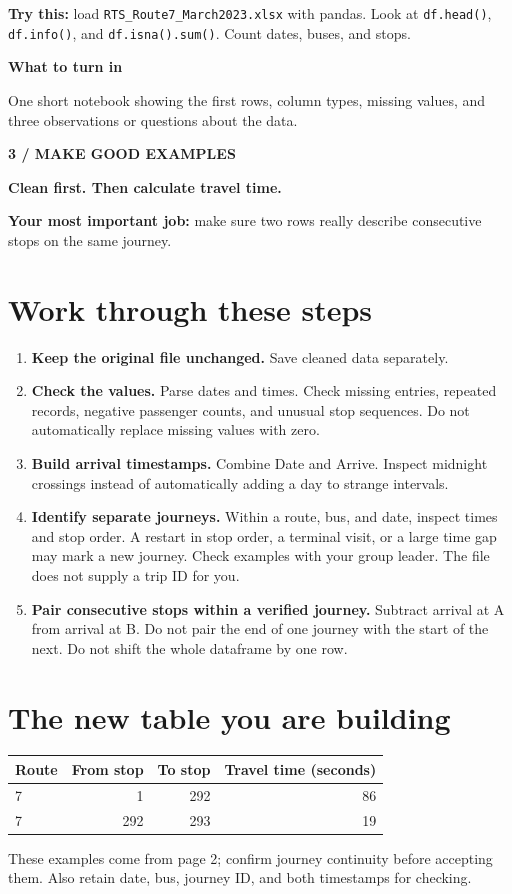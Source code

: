 \documentclass[11pt,letterpaper]{article}
\newcommand{\heading}[2]{{\small\color{accent}\textbf{#1}}\par{\LARGE\bfseries #2}\par\vspace{4pt}}
\newcommand{\turnin}[1]{\vspace{6pt}\colorbox{light}{\parbox{0.96\linewidth}{\textbf{What to turn in}\par #1}}}
\begin{document}
\textbf{Try this:} load \texttt{RTS\_Route7\_March2023.xlsx} with pandas.
Look at \texttt{df.head()}, \texttt{df.info()}, and
\texttt{df.isna().sum()}. Count dates, buses, and stops.

\turnin{One short notebook showing the first rows, column types, missing
values, and three observations or questions about the data.}

\newpage
\heading{3 / MAKE GOOD EXAMPLES}{Clean first. Then calculate travel time.}
\textbf{Your most important job:} make sure two rows really describe
consecutive stops on the same journey.

\section*{Work through these steps}
\begin{enumerate}
\item \textbf{Keep the original file unchanged.} Save cleaned data separately.
\item \textbf{Check the values.} Parse dates and times. Check missing entries,
repeated records, negative passenger counts, and unusual stop sequences.
Do not automatically replace missing values with zero.
\item \textbf{Build arrival timestamps.} Combine Date and Arrive. Inspect
midnight crossings instead of automatically adding a day to strange intervals.
\item \textbf{Identify separate journeys.} Within a route, bus, and date,
inspect times and stop order. A restart in stop order, a terminal visit, or
a large time gap may mark a new journey. Check examples with your group leader.
The file does not supply a trip ID for you.
\item \textbf{Pair consecutive stops within a verified journey.} Subtract
arrival at A from arrival at B. Do not pair the end of one journey with the
start of the next. Do not shift the whole dataframe by one row.
\end{enumerate}

\section*{The new table you are building}
\begin{center}
\begin{tabular}{@{}lrrr@{}}
\toprule
Route & From stop & To stop & Travel time (seconds)\\
\midrule
7 & 1 & 292 & 86\\
7 & 292 & 293 & 19\\
\bottomrule
\end{tabular}
\end{center}
These examples come from page 2; confirm journey continuity before accepting
them. Also retain date, bus, journey ID, and both timestamps for checking.
\end{document}
